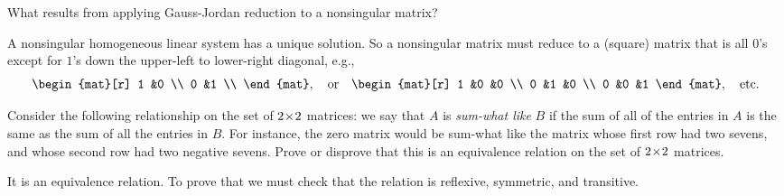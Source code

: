 \begin{exercises}
  \recommended \item  
    What results from applying Gauss-Jordan reduction to a
    nonsingular matrix?
    \begin{answer}
      A nonsingular homogeneous linear system has a unique solution.
      So a nonsingular matrix must reduce to a (square) 
      matrix that is all \( 0 \)'s
      except for \( 1 \)'s down the upper-left to lower-right diagonal, e.g.,
      \begin{equation*}
         \begin{mat}[r]
           1  &0  \\
           0  &1  \\
         \end{mat},
         \quad\text{or}\quad
         \begin{mat}[r]
           1  &0  &0  \\
           0  &1  &0  \\
           0  &0  &1
         \end{mat},
         \quad\text{etc.}
      \end{equation*}  
    \end{answer}
 \item \cite{Cleary}
    Consider the following relationship on the set of $2 \! \times \! 2$ matrices:  
    we say that $A$ is \textit{sum-what like} $B$ if the sum of all of 
    the entries in $A$ is the same as the sum of all the entries in $B$.  
    For instance, the zero matrix would be sum-what like the matrix 
    whose first row had two sevens, and whose second row had two 
    negative sevens.
    Prove or disprove that this is an equivalence relation on the set 
    of $2 \! \times \! 2$ matrices.
    \begin{answer}
      It is an equivalence relation.
      To prove that we must check that the relation 
      is reflexive, symmetric, and transitive.


\end{answer}
\end{exercises}
